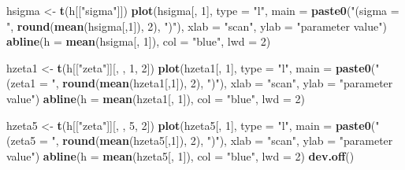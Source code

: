 \documentclass[12pt, twoside]{amherstthesis}
\newenvironment{Shaded}{\begin{snugshade}}{\end{snugshade}}
\newcommand{\AttributeTok}[1]{\textcolor[rgb]{0.13,0.29,0.53}{#1}}
\newcommand{\DecValTok}[1]{\textcolor[rgb]{0.00,0.00,0.81}{#1}}
\newcommand{\FunctionTok}[1]{\textcolor[rgb]{0.13,0.29,0.53}{\textbf{#1}}}
\newcommand{\NormalTok}[1]{#1}
\newcommand{\OtherTok}[1]{\textcolor[rgb]{0.56,0.35,0.01}{#1}}
\newcommand{\StringTok}[1]{\textcolor[rgb]{0.31,0.60,0.02}{#1}}
\begin{document}
\begin{Shaded}
\begin{Highlighting}[]
\NormalTok{hsigma }\OtherTok{\textless{}{-}} \FunctionTok{t}\NormalTok{(h[[}\StringTok{"sigma"}\NormalTok{]])}
\FunctionTok{plot}\NormalTok{(hsigma[, }\DecValTok{1}\NormalTok{], }\AttributeTok{type =} \StringTok{"l"}\NormalTok{, }
     \AttributeTok{main =} \FunctionTok{paste0}\NormalTok{(}\StringTok{"(sigma = "}\NormalTok{, }\FunctionTok{round}\NormalTok{(}\FunctionTok{mean}\NormalTok{(hsigma[,}\DecValTok{1}\NormalTok{]), }\DecValTok{2}\NormalTok{), }\StringTok{")"}\NormalTok{), }
     \AttributeTok{xlab =} \StringTok{"scan"}\NormalTok{, }\AttributeTok{ylab =} \StringTok{"parameter value"}\NormalTok{)}
\FunctionTok{abline}\NormalTok{(}\AttributeTok{h =} \FunctionTok{mean}\NormalTok{(hsigma[, }\DecValTok{1}\NormalTok{]), }\AttributeTok{col =} \StringTok{"blue"}\NormalTok{, }\AttributeTok{lwd =} \DecValTok{2}\NormalTok{)}

\NormalTok{hzeta1 }\OtherTok{\textless{}{-}} \FunctionTok{t}\NormalTok{(h[[}\StringTok{"zeta"}\NormalTok{]][, , }\DecValTok{1}\NormalTok{, }\DecValTok{2}\NormalTok{])}
\FunctionTok{plot}\NormalTok{(hzeta1[, }\DecValTok{1}\NormalTok{], }\AttributeTok{type =} \StringTok{"l"}\NormalTok{, }
     \AttributeTok{main =} \FunctionTok{paste0}\NormalTok{(}\StringTok{"(zeta1 = "}\NormalTok{, }\FunctionTok{round}\NormalTok{(}\FunctionTok{mean}\NormalTok{(hzeta1[,}\DecValTok{1}\NormalTok{]), }\DecValTok{2}\NormalTok{), }\StringTok{")"}\NormalTok{), }
     \AttributeTok{xlab =} \StringTok{"scan"}\NormalTok{, }\AttributeTok{ylab =} \StringTok{"parameter value"}\NormalTok{)}
\FunctionTok{abline}\NormalTok{(}\AttributeTok{h =} \FunctionTok{mean}\NormalTok{(hzeta1[, }\DecValTok{1}\NormalTok{]), }\AttributeTok{col =} \StringTok{"blue"}\NormalTok{, }\AttributeTok{lwd =} \DecValTok{2}\NormalTok{)}

\NormalTok{hzeta5 }\OtherTok{\textless{}{-}} \FunctionTok{t}\NormalTok{(h[[}\StringTok{"zeta"}\NormalTok{]][, , }\DecValTok{5}\NormalTok{, }\DecValTok{2}\NormalTok{])}
\FunctionTok{plot}\NormalTok{(hzeta5[, }\DecValTok{1}\NormalTok{], }\AttributeTok{type =} \StringTok{"l"}\NormalTok{, }
     \AttributeTok{main =} \FunctionTok{paste0}\NormalTok{(}\StringTok{"(zeta5 = "}\NormalTok{, }\FunctionTok{round}\NormalTok{(}\FunctionTok{mean}\NormalTok{(hzeta5[,}\DecValTok{1}\NormalTok{]), }\DecValTok{2}\NormalTok{), }\StringTok{")"}\NormalTok{), }
     \AttributeTok{xlab =} \StringTok{"scan"}\NormalTok{, }\AttributeTok{ylab =} \StringTok{"parameter value"}\NormalTok{)}
\FunctionTok{abline}\NormalTok{(}\AttributeTok{h =} \FunctionTok{mean}\NormalTok{(hzeta5[, }\DecValTok{1}\NormalTok{]), }\AttributeTok{col =} \StringTok{"blue"}\NormalTok{, }\AttributeTok{lwd =} \DecValTok{2}\NormalTok{)}
\FunctionTok{dev.off}\NormalTok{()}


\end{Highlighting}
\end{Shaded}
\end{document}
